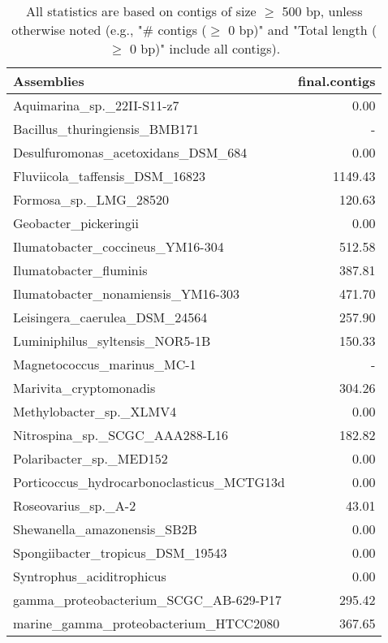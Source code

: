 \documentclass[12pt,a4paper]{article}
\begin{document}
\begin{table}[ht]
\begin{center}
\caption{All statistics are based on contigs of size $\geq$ 500 bp, unless otherwise noted (e.g., "\# contigs ($\geq$ 0 bp)" and "Total length ($\geq$ 0 bp)" include all contigs).}
\begin{tabular}{|l*{1}{|r}|}
\hline
Assemblies & final.contigs \\ \hline
Aquimarina\_sp.\_22II-S11-z7 & 0.00 \\ \hline
Bacillus\_thuringiensis\_BMB171 & - \\ \hline
Desulfuromonas\_acetoxidans\_DSM\_684 & 0.00 \\ \hline
Fluviicola\_taffensis\_DSM\_16823 & 1149.43 \\ \hline
Formosa\_sp.\_LMG\_28520 & 120.63 \\ \hline
Geobacter\_pickeringii & 0.00 \\ \hline
Ilumatobacter\_coccineus\_YM16-304 & 512.58 \\ \hline
Ilumatobacter\_fluminis & 387.81 \\ \hline
Ilumatobacter\_nonamiensis\_YM16-303 & 471.70 \\ \hline
Leisingera\_caerulea\_DSM\_24564 & 257.90 \\ \hline
Luminiphilus\_syltensis\_NOR5-1B & 150.33 \\ \hline
Magnetococcus\_marinus\_MC-1 & - \\ \hline
Marivita\_cryptomonadis & 304.26 \\ \hline
Methylobacter\_sp.\_XLMV4 & 0.00 \\ \hline
Nitrospina\_sp.\_SCGC\_AAA288-L16 & 182.82 \\ \hline
Polaribacter\_sp.\_MED152 & 0.00 \\ \hline
Porticoccus\_hydrocarbonoclasticus\_MCTG13d & 0.00 \\ \hline
Roseovarius\_sp.\_A-2 & 43.01 \\ \hline
Shewanella\_amazonensis\_SB2B & 0.00 \\ \hline
Spongiibacter\_tropicus\_DSM\_19543 & 0.00 \\ \hline
Syntrophus\_aciditrophicus & 0.00 \\ \hline
gamma\_proteobacterium\_SCGC\_AB-629-P17 & 295.42 \\ \hline
marine\_gamma\_proteobacterium\_HTCC2080 & 367.65 \\ \hline
\end{tabular}
\end{center}
\end{table}
\end{document}
